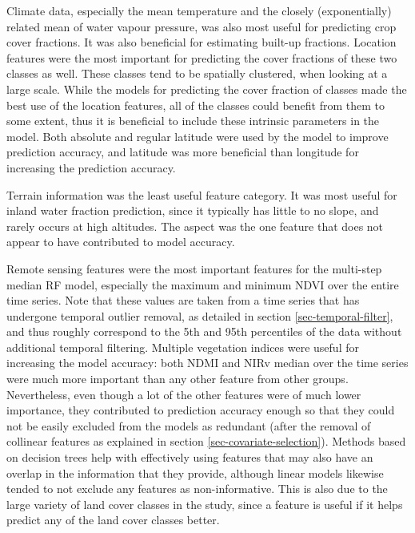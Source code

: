 \documentclass[review,authoryear,3p]{elsarticle}
\begin{document}
Climate data, especially the mean temperature and the closely (exponentially) related mean of water vapour pressure, was also most useful for predicting crop cover fractions.
It was also beneficial for estimating built-up fractions.
Location features were the most important for predicting the cover fractions of these two classes as well.
These classes tend to be spatially clustered, when looking at a large scale.
While the models for predicting the cover fraction of classes made the best use of the location features, all of the classes could benefit from them to some extent, thus it is beneficial to include these intrinsic parameters in the model.
Both absolute and regular latitude were used by the model to improve prediction accuracy, and latitude was more beneficial than longitude for increasing the prediction accuracy.

Terrain information was the least useful feature category.
It was most useful for inland water fraction prediction, since it typically has little to no slope, and rarely occurs at high altitudes.
The aspect was the one feature that does not appear to have contributed to model accuracy.

Remote sensing features were the most important features for the multi-step median \gls{RF} model, especially the maximum and minimum \gls{NDVI} over the entire time series.
Note that these values are taken from a time series that has undergone temporal outlier removal, as detailed in section \ref{sec-temporal-filter}, and thus roughly correspond to the 5th and 95th percentiles of the data without additional temporal filtering.
Multiple vegetation indices were useful for increasing the model accuracy: both \gls{NDMI} and \gls{NIRv} median over the time series were much more important than any other feature from other groups.
Nevertheless, even though a lot of the other features were of much lower importance, they contributed to prediction accuracy enough so that they could not be easily excluded from the models as redundant (after the removal of collinear features as explained in section \ref{sec-covariate-selection}).
Methods based on decision trees help with effectively using features that may also have an overlap in the information that they provide, although linear models likewise tended to not exclude any features as non-informative.
This is also due to the large variety of land cover classes in the study, since a feature is useful if it helps predict any of the land cover classes better.
\end{document}
